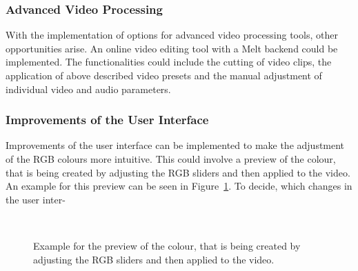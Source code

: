 \documentclass[../MasterThesis.tex]{subfiles}
\begin{document}
\subsubsection*{Advanced Video Processing}

With the implementation of options for advanced video processing tools, other opportunities arise. An online video editing tool with a Melt backend could be implemented. The functionalities could include the cutting of video clips, the application of above described video presets and the manual adjustment of individual video and audio parameters.










\subsubsection*{Improvements of the User Interface}

\vspace*{0.5em}

\begin{minipage}{0.38\textwidth}
	Improvements of the user interface can be implemented to make the adjustment of the RGB colours more intuitive. This could involve a preview of the colour, that is being created by adjusting the RGB sliders and then applied to the video. An example for this preview can be seen in Figure~\ref{figure:UI}.
	To decide, which changes in the user inter-
\end{minipage}\begin{minipage}{0.04\textwidth}
	\ 
\end{minipage}\begin{minipage}{0.58\textwidth}
	\begin{figure}[H]
		\begin{center}
			\caption[Example for the colour preview of the RGB sliders.]{Example for the preview of the colour, that is being created by adjusting the RGB sliders and then applied to the video.}
			\label{figure:UI}
		\end{center}
	\end{figure}
	\vfill
\end{minipage}
\end{document}
